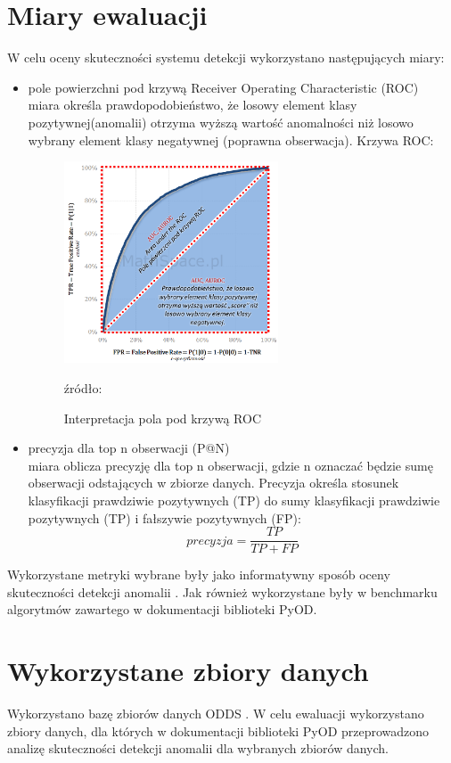 \section{Miary ewaluacji}
W celu oceny skuteczności systemu detekcji wykorzystano następujących miary:
\begin{itemize}
    \item pole powierzchni pod krzywą Receiver Operating Characteristic (ROC) \\
    miara określa prawdopodobieństwo, że losowy element klasy pozytywnej(anomalii) otrzyma wyższą wartość anomalności niż losowo wybrany element klasy negatywnej (poprawna obserwacja). Krzywa ROC:
    \begin{figure}[!h]
        \centering
        \includegraphics[width = 0.6\textwidth]{chapters/analiza/img/ROC-interpr-AUROC.png}
        \caption{Interpretacja pola pod krzywą ROC}
        \footnotesize{źródło: \cite{roc-image} }
        \label{fig:my_label}
    \end{figure}
    \item precyzja dla top n obserwacji (P@N) \\
    miara oblicza precyzję dla top n obserwacji, gdzie n oznaczać będzie sumę obserwacji odstających w zbiorze danych. Precyzja określa stosunek klasyfikacji prawdziwie pozytywnych (TP) do sumy klasyfikacji prawdziwie pozytywnych (TP) i fałszywie pozytywnych (FP):
    \begin{equation}
        precyzja = \frac{TP}{TP+FP}
    \end{equation}
\end{itemize}
Wykorzystane metryki wybrane były jako informatywny sposób oceny skuteczności detekcji anomalii \cite{campos2016evaluation}. Jak również wykorzystane były w benchmarku algorytmów zawartego w dokumentacji biblioteki PyOD.

\section{Wykorzystane zbiory danych }
Wykorzystano bazę zbiorów danych ODDS \cite{ODDS}. W celu ewaluacji wykorzystano zbiory danych, dla których w dokumentacji biblioteki PyOD przeprowadzono analizę skuteczności detekcji anomalii dla wybranych zbiorów danych.